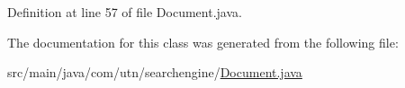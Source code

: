 \-Definition at line 57 of file \-Document.\-java.



\-The documentation for this class was generated from the following file\-:\begin{DoxyCompactItemize}
\item 
src/main/java/com/utn/searchengine/\hyperlink{_document_8java}{\-Document.\-java}\end{DoxyCompactItemize}
